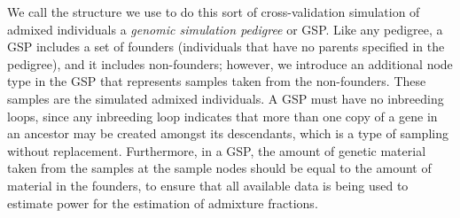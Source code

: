 We call the structure
we use to do this sort of cross-validation simulation of admixed individuals
a {\em genomic simulation pedigree} or GSP.  Like any pedigree,
a GSP includes a set of founders (individuals that have no parents specified in the
pedigree), and it includes non-founders; however, we introduce an additional node
type in the GSP that represents samples taken from the non-founders. These samples
are the simulated admixed individuals.  A GSP must have no inbreeding loops, since
any inbreeding loop indicates that more than one copy of a gene in an ancestor may
be created amongst its descendants, which is a type of sampling without
replacement.  Furthermore, in a GSP, the amount of genetic material taken from the
samples at the sample nodes should be equal to the amount of material in the founders,
to ensure that all available data is being used to estimate power for the estimation of
admixture fractions.

